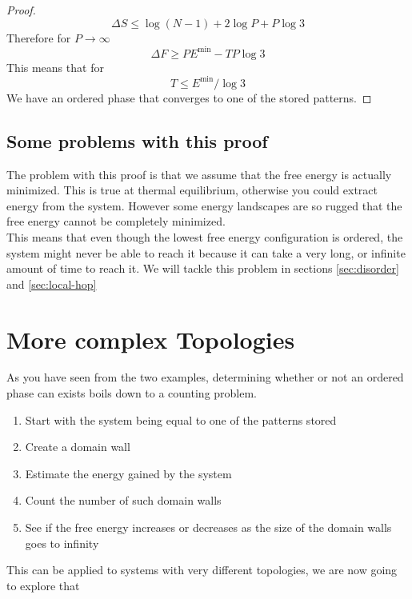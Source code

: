 \documentclass{article}
\theoremstyle{definition}
\theoremstyle{remark}
\begin{document}
\begin{proof}
    \begin{equation}
        \Delta S\le \log(N-1) + 2\log P +P\log3
    \end{equation}
    Therefore for $P\to \infty$
    \begin{equation}
        \Delta F\ge P E^\textrm{min} - TP\log3
    \end{equation}
    This means that for
    \begin{equation}
        T\le E^\textrm{min}/\log3
    \end{equation}
    We have an ordered phase that converges to one of the stored patterns.
\end{proof}
\subsection{Some problems with this proof}
    The problem with this proof is that we assume that the free energy is actually minimized. This is true at thermal equilibrium, otherwise you could extract energy from the system. However some energy landscapes are so rugged that the free energy cannot be completely minimized.\\
    This means that even though the lowest free energy configuration is ordered, the system might never be able to reach it because it can take a very long, or infinite amount of time to reach it. We will tackle this problem in sections \ref{sec:disorder} and \ref{sec:local-hop}
\section{More complex Topologies}
As you have seen from the two examples, determining whether or not an ordered phase can exists boils down to a counting problem.\newline
\begin{enumerate}
    \item Start with the system being equal to one of the patterns stored
    \item Create a domain wall
    \item Estimate the energy gained by the system
    \item Count the number of such domain walls
    \item See if the free energy increases or decreases as the size of the domain walls goes to infinity
\end{enumerate}
This can be applied to systems with very different topologies, we are now going to explore that
\end{document}
